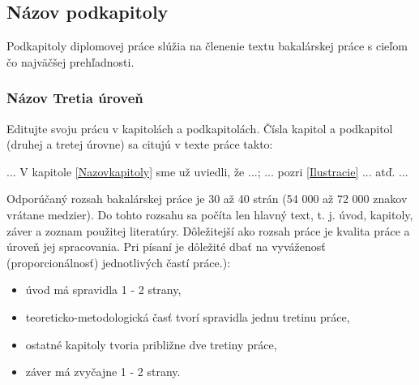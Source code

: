 \subsection{Názov podkapitoly}
\label{Nazovpodkapitoly}

Podkapitoly diplomovej práce slúžia na členenie textu bakalárskej práce s cieľom čo najväčšej prehľadnosti.


\subsubsection{Názov Tretia úroveň} 
Editujte svoju prácu v kapitolách a podkapitolách. Čísla kapitol a podkapitol (druhej a tretej úrovne) sa citujú v texte práce takto: 

... V kapitole \ref{Nazovkapitoly} sme už uviedli, že ...; ... pozri \ref{Ilustracie} ... atď. ...

Odporúčaný rozsah bakalárskej práce je 30 až 40 strán (54 000 až 72 000 znakov vrátane medzier). Do tohto rozsahu sa počíta len hlavný text, t. j. úvod, kapitoly, záver a zoznam použitej literatúry. Dôležitejší ako rozsah práce je kvalita práce a úroveň jej spracovania. Pri písaní je dôležité dbať na vyváženosť (proporcionálnosť) jednotlivých častí práce.):
\begin{itemize}
	\item úvod má spravidla  1 - 2 strany,
	\item teoreticko-metodologická časť tvorí spravidla jednu tretinu práce,
	\item ostatné kapitoly tvoria približne dve tretiny práce,
	\item záver má zvyčajne 1 - 2 strany.
\end{itemize}


